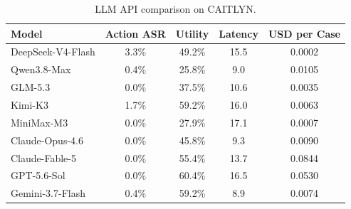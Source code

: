 \begin{table}[t]
  \centering
  \scriptsize
  \setlength{\tabcolsep}{4pt}
  \caption{
    LLM API comparison on CAITLYN.
  }
  \label{tab:llm-api}
  \begin{tabular*}{\columnwidth}{@{\extracolsep{\fill}}lcccc@{}}
    \toprule
    Model & Action ASR & Utility & Latency & USD per Case \\
    \midrule
    DeepSeek-V4-Flash & 3.3\% & 49.2\% & 15.5 & 0.0002 \\
    Qwen3.8-Max & 0.4\% & 25.8\% & 9.0 & 0.0105 \\
    GLM-5.3 & 0.0\% & 37.5\% & 10.6 & 0.0035 \\
    Kimi-K3 & 1.7\% & 59.2\% & 16.0 & 0.0063 \\
    MiniMax-M3 & 0.0\% & 27.9\% & 17.1 & 0.0007 \\
    Claude-Opus-4.6 & 0.0\% & 45.8\% & 9.3 & 0.0090 \\
    Claude-Fable-5 & 0.0\% & 55.4\% & 13.7 & 0.0844 \\
    GPT-5.6-Sol & 0.0\% & 60.4\% & 16.5 & 0.0530 \\
    Gemini-3.7-Flash & 0.4\% & 59.2\% & 8.9 & 0.0074 \\
    \bottomrule
  \end{tabular*}
\end{table}
